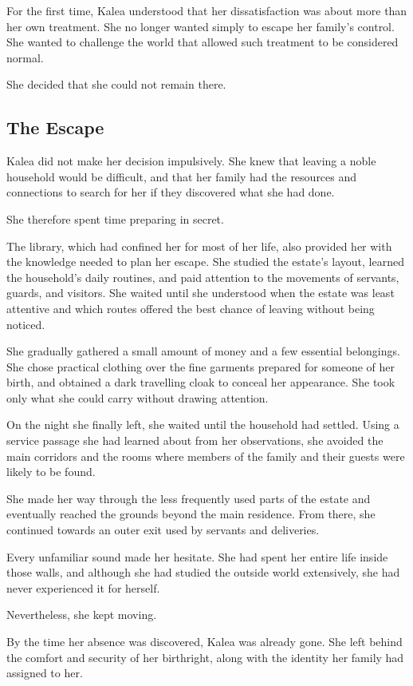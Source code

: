 \documentclass[11pt,a4paper,twoside]{article}
\begin{document}
For the first time, Kalea understood that her dissatisfaction was about more than her own treatment. She no longer wanted simply to escape her family's control. She wanted to challenge the world that allowed such treatment to be considered normal.

She decided that she could not remain there.

\subsection{The Escape}

Kalea did not make her decision impulsively. She knew that leaving a noble household would be difficult, and that her family had the resources and connections to search for her if they discovered what she had done.

She therefore spent time preparing in secret.

The library, which had confined her for most of her life, also provided her with the knowledge needed to plan her escape. She studied the estate's layout, learned the household's daily routines, and paid attention to the movements of servants, guards, and visitors. She waited until she understood when the estate was least attentive and which routes offered the best chance of leaving without being noticed.

She gradually gathered a small amount of money and a few essential belongings. She chose practical clothing over the fine garments prepared for someone of her birth, and obtained a dark travelling cloak to conceal her appearance. She took only what she could carry without drawing attention.

On the night she finally left, she waited until the household had settled. Using a service passage she had learned about from her observations, she avoided the main corridors and the rooms where members of the family and their guests were likely to be found.

She made her way through the less frequently used parts of the estate and eventually reached the grounds beyond the main residence. From there, she continued towards an outer exit used by servants and deliveries.

Every unfamiliar sound made her hesitate. She had spent her entire life inside those walls, and although she had studied the outside world extensively, she had never experienced it for herself.

Nevertheless, she kept moving.

By the time her absence was discovered, Kalea was already gone. She left behind the comfort and security of her birthright, along with the identity her family had assigned to her.
\end{document}
